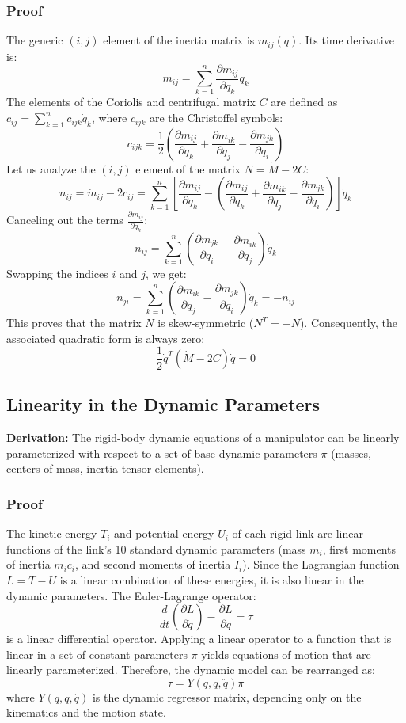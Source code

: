 \documentclass[11pt,a4paper]{article}
\begin{document}
\subsubsection{Proof}
The generic $(i,j)$ element of the inertia matrix is $m_{ij}(q)$. Its time derivative is:
\[
\dot{m}_{ij} = \sum_{k=1}^{n} \frac{\partial m_{ij}}{\partial q_k} \dot{q}_k
\]
The elements of the Coriolis and centrifugal matrix $C$ are defined as $c_{ij} = \sum_{k=1}^n c_{ijk} \dot{q}_k$, where $c_{ijk}$ are the Christoffel symbols:
\[
c_{ijk} = \frac{1}{2} \left( \frac{\partial m_{ij}}{\partial q_k} + \frac{\partial m_{ik}}{\partial q_j} - \frac{\partial m_{jk}}{\partial q_i} \right)
\]
Let us analyze the $(i,j)$ element of the matrix $N = \dot{M} - 2C$:
\[
n_{ij} = \dot{m}_{ij} - 2 c_{ij} = \sum_{k=1}^n \left[ \frac{\partial m_{ij}}{\partial q_k} - \left( \frac{\partial m_{ij}}{\partial q_k} + \frac{\partial m_{ik}}{\partial q_j} - \frac{\partial m_{jk}}{\partial q_i} \right) \right] \dot{q}_k
\]
Canceling out the terms $\frac{\partial m_{ij}}{\partial q_k}$:
\[
n_{ij} = \sum_{k=1}^n \left( \frac{\partial m_{jk}}{\partial q_i} - \frac{\partial m_{ik}}{\partial q_j} \right) \dot{q}_k
\]
Swapping the indices $i$ and $j$, we get:
\[
n_{ji} = \sum_{k=1}^n \left( \frac{\partial m_{ik}}{\partial q_j} - \frac{\partial m_{jk}}{\partial q_i} \right) \dot{q}_k = - n_{ij}
\]
This proves that the matrix $N$ is skew-symmetric ($N^T = -N$). 
Consequently, the associated quadratic form is always zero:
\[
\frac{1}{2} \dot{q}^T (\dot{M} - 2C) \dot{q} = 0
\]


\subsection{Linearity in the Dynamic Parameters}
\textbf{Derivation:} The rigid-body dynamic equations of a manipulator can be linearly parameterized with respect to a set of base dynamic parameters $\pi$ (masses, centers of mass, inertia tensor elements).

\subsubsection{Proof}
The kinetic energy $T_i$ and potential energy $U_i$ of each rigid link are linear functions of the link's 10 standard dynamic parameters (mass $m_i$, first moments of inertia $m_i c_{i}$, and second moments of inertia $I_i$). 
Since the Lagrangian function $L = T - U$ is a linear combination of these energies, it is also linear in the dynamic parameters.
The Euler-Lagrange operator:
\[
\frac{d}{dt}\left(\frac{\partial L}{\partial \dot{q}}\right) - \frac{\partial L}{\partial q} = \tau
\]
is a linear differential operator. Applying a linear operator to a function that is linear in a set of constant parameters $\pi$ yields equations of motion that are linearly parameterized. Therefore, the dynamic model can be rearranged as:
\[
\tau = Y(q, \dot{q}, \ddot{q}) \pi
\]
where $Y(q, \dot{q}, \ddot{q})$ is the dynamic regressor matrix, depending only on the kinematics and the motion state.
\end{document}
